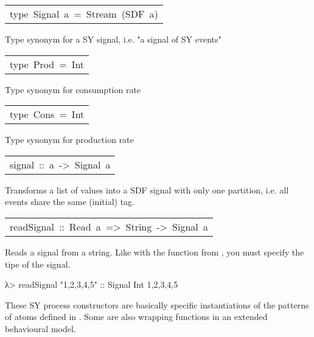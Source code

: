 \begin{haddockdesc}
\item[\begin{tabular}{@{}l}
type\ Signal\ a\ =\ Stream\ (SDF\ a)
\end{tabular}]\haddockbegindoc
Type synonym for a SY signal, i.e. "a signal of SY events"\par


\item[\begin{tabular}{@{}l}
type\ Prod\ =\ Int
\end{tabular}]\haddockbegindoc
Type synonym for consumption rate\par


\item[\begin{tabular}{@{}l}
type\ Cons\ =\ Int
\end{tabular}]\haddockbegindoc
Type synonym for production rate\par


\item[\begin{tabular}{@{}l}
signal\ ::\ {\char 91}a{\char 93}\ ->\ Signal\ a
\end{tabular}]\haddockbegindoc
Transforms a list of values into a SDF signal with only one
 partition, i.e. all events share the same (initial) tag.\par


\item[\begin{tabular}{@{}l}
readSignal\ ::\ Read\ a\ =>\ String\ ->\ Signal\ a
\end{tabular}]\haddockbegindoc
Reads a signal from a string. Like with the  function from
 , you must specify the tipe of the signal.\par
\begin{interactive}
λ> readSignal "{1,2,3,4,5}" :: Signal Int
{1,2,3,4,5}

\end{interactive}
\end{haddockdesc}
These SY process constructors are basically specific
 instantiations of the patterns of atoms defined in
 . Some are also wrapping functions in an
 extended behavioural model.\par

